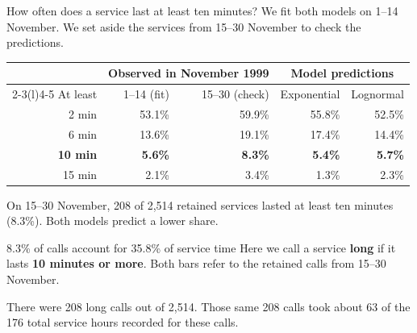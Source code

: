 \documentclass{beamer}
\begin{document}
\begin{frame}{How often does a service last at least ten minutes?}
  \small
  We fit both models on 1--14 November. We set aside the services from
  15--30 November to check the predictions.

  \vspace{0.65em}
  \centering
  \begin{tabular}{@{}rrrrr@{}}
    \toprule
    & \multicolumn{2}{c}{Observed in November 1999}
    & \multicolumn{2}{c}{Model predictions}\\
    \cmidrule(lr){2-3}\cmidrule(l){4-5}
    At least & 1--14 (fit) & 15--30 (check) & Exponential & Lognormal\\
    \midrule
    2 min  & 53.1\% & 59.9\% & 55.8\% & 52.5\%\\
    6 min  & 13.6\% & 19.1\% & 17.4\% & 14.4\%\\
    \textbf{10 min} & \textbf{5.6\%} & \textbf{8.3\%} & \textbf{5.4\%} & \textbf{5.7\%}\\
    15 min &  2.1\% &  3.4\% &  1.3\% &  2.3\%\\
    \bottomrule
  \end{tabular}

  \vspace{0.65em}
  \raggedright
  On 15--30 November, 208 of 2,514 retained services lasted at least ten
  minutes (8.3\%). Both models predict a lower share.
\end{frame}

\begin{frame}{8.3\% of calls account for 35.8\% of service time}
  Here we call a service \textbf{long} if it lasts \textbf{10 minutes or
  more}. Both bars refer to the retained calls from 15--30 November.

  \vspace{0.6em}
  \centering

  \vspace{0.6em}
  \raggedright
  There were 208 long calls out of 2,514. Those same 208 calls took
  about 63 of the 176 total service hours recorded for these calls.
\end{frame}
\end{document}
